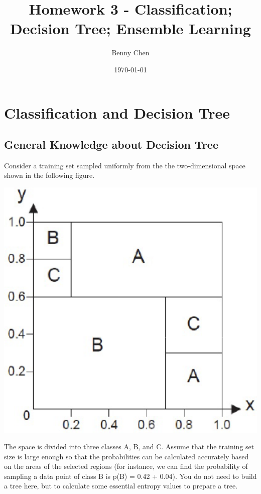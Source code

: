 \documentclass{article}
\title{Homework 3 - Classification; Decision Tree; Ensemble Learning}
\author{Benny Chen}
\date{\today}
\begin{document}
\maketitle

\section{Classification and Decision Tree}

\subsection{General Knowledge about Decision Tree}

Consider a training set sampled uniformly from the the two-dimensional space shown in the following figure.

\begin{center}
    \includegraphics[scale=0.5]{images/q1.png}
\end{center}

The space is divided into three classes A, B, and C. Assume that the training set size is large enough so that the probabilities can be calculated accurately based on the areas of the selected regions (for instance, we can find the probability of sampling a data point of class B is p(B) = 0.42 + 0.04). You do not need to build a tree here,
but to calculate some essential entropy values to prepare a tree.
\end{document}
